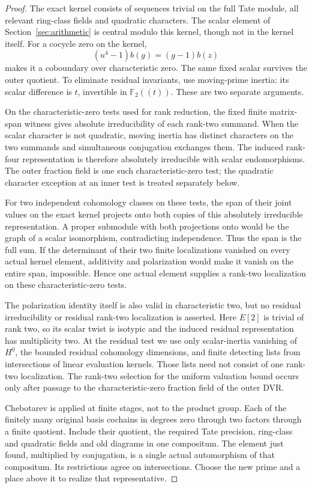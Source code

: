 \documentclass[11pt]{article}
\theoremstyle{definition}
\theoremstyle{remark}
\newcommand{\F}{\mathbb F}
\begin{document}
\begin{proof}\leavevmode
The exact kernel consists of sequences trivial on the full Tate
module, all relevant ring-class fields and quadratic characters.
The scalar element of Section~\ref{sec:arithmetic} is central modulo
this kernel, though not in the kernel itself.
For a cocycle zero on the kernel,
\[
 (u^4-1)b(g)=(g-1)b(z)
\]
makes it a coboundary over characteristic zero. The same fixed scalar
survives the outer quotient. To eliminate residual invariants, use moving-prime
inertia: its scalar difference is $t$, invertible in $\F_2((t))$.
These are two separate arguments.

On the characteristic-zero tests used for rank reduction, the fixed
finite matrix-span witness gives absolute irreducibility of each
rank-two summand. When the scalar character is not quadratic, moving
inertia has distinct characters on the two summands and simultaneous
conjugation exchanges them. The induced rank-four representation is
therefore absolutely irreducible with scalar endomorphisms. The outer
fraction field is one such characteristic-zero test; the quadratic
character exception at an inner test is treated separately below.

For two independent cohomology classes on these tests, the span of
their joint values on the exact kernel projects onto both copies of
this absolutely irreducible representation. A proper submodule with
both projections onto would be the graph of a scalar isomorphism,
contradicting independence. Thus the span is the full sum. If the
determinant of their two finite localizations vanished on every actual
kernel element, additivity and polarization would make it vanish on
the entire span, impossible. Hence one actual element supplies a
rank-two localization on these characteristic-zero tests.

The polarization identity itself is also valid in characteristic two,
but no residual irreducibility or residual rank-two localization is
asserted. Here $E[2]$ is trivial of rank two, so its scalar twist is
isotypic and the induced residual representation has multiplicity two.
At the residual test we use only scalar-inertia vanishing of $H^0$,
the bounded residual cohomology dimensions, and finite detecting lists
from intersections of linear evaluation kernels. Those lists need not
consist of one rank-two localization. The rank-two selection for the
uniform valuation bound occurs only after passage to the
characteristic-zero fraction field of the outer DVR.

Chebotarev is applied at finite stages, not to the product group.
Each of the finitely many original basis cochains in degrees zero
through two factors through a finite quotient. Include their quotient,
the required Tate precision, ring-class and quadratic fields and old
diagrams in one compositum. The element just found, multiplied by
conjugation, is a single actual automorphism of that compositum.
Its restrictions agree on intersections. Choose the new prime and
a place above it to realize that representative.


\end{proof}
\end{document}
